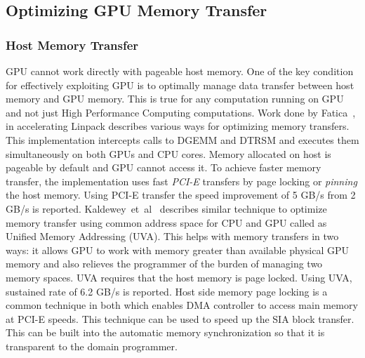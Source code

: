 \subsection{Optimizing GPU Memory Transfer}
\subsubsection{Host Memory Transfer}
GPU cannot work directly with pageable host memory. One of the key condition for
effectively exploiting GPU is to optimally manage data transfer between host memory
and GPU memory. This is true for any computation running on GPU and not just High
Performance Computing computations. Work done by Fatica~\cite{Fatica:2009:ALC:1513895.1513901},
in accelerating Linpack describes various ways for optimizing memory transfers. This
implementation intercepts calls to DGEMM and DTRSM and executes them simultaneously
on both GPUs and CPU cores. Memory allocated on host is pageable by default and GPU
cannot access it. To achieve faster memory transfer, the implementation uses fast
\textit{PCI-E} transfers by page locking or \textit{pinning} the host memory. Using
PCI-E transfer the speed improvement of 5 GB/s from 2 GB/s is reported.
Kaldewey~et~al~\cite{Kaldewey:2012:GJP:2236584.2236592} describes similar technique
to optimize memory transfer using common address space for CPU and GPU called as
Unified Memory Addressing (UVA). This helps with memory transfers in two ways: it
allows GPU to work with memory greater than available physical GPU memory and also relieves
the programmer of the burden of managing two memory spaces. UVA requires that the
host memory is page locked. Using UVA, sustained rate of 6.2 GB/s is reported.
Host side memory page locking is a common technique in both which enables DMA controller
to access main memory at PCI-E speeds. This technique can be used to speed up the
SIA block transfer. This can be built into the automatic memory synchronization
so that it is transparent to the domain programmer.

